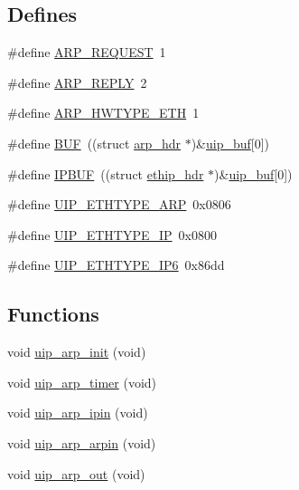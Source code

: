 \subsection*{Defines}
\begin{DoxyCompactItemize}
\item 
\#define \hyperlink{group__uiparp_ga7a7c46ffaba30477b8c9e3e61bd2e106}{ARP\_\-REQUEST}~1
\item 
\#define \hyperlink{group__uiparp_ga06ba7b414e718081998f2814090debf1}{ARP\_\-REPLY}~2
\item 
\#define \hyperlink{group__uiparp_gabb56b549f7ab4d86e1cc39b8afc70d1e}{ARP\_\-HWTYPE\_\-ETH}~1
\item 
\#define \hyperlink{group__uiparp_ga24f52ac52d6e714cb04a5aa01be3bdd0}{BUF}~((struct \hyperlink{structarp__hdr}{arp\_\-hdr} $\ast$)\&\hyperlink{group__uipdevfunc_gab81e78f890dbbee50c533a9734b74fd9}{uip\_\-buf}\mbox{[}0\mbox{]})
\item 
\#define \hyperlink{group__uiparp_ga9f2196e2705036869611962425e404bf}{IPBUF}~((struct \hyperlink{structethip__hdr}{ethip\_\-hdr} $\ast$)\&\hyperlink{group__uipdevfunc_gab81e78f890dbbee50c533a9734b74fd9}{uip\_\-buf}\mbox{[}0\mbox{]})
\item 
\#define \hyperlink{group__uiparp_ga3e1562e8a6de32268e5df92a52152f91}{UIP\_\-ETHTYPE\_\-ARP}~0x0806
\item 
\#define \hyperlink{group__uiparp_ga03d140db75de3d3cdfbbab1c4fed8d8d}{UIP\_\-ETHTYPE\_\-IP}~0x0800
\item 
\#define \hyperlink{group__uiparp_gabb558f3a9b1ec015e83c314aba694e35}{UIP\_\-ETHTYPE\_\-IP6}~0x86dd
\end{DoxyCompactItemize}
\subsection*{Functions}
\begin{DoxyCompactItemize}
\item 
void \hyperlink{group__uiparp_ga2d9d28afa353f662b9bb5234fc419f72}{uip\_\-arp\_\-init} (void)
\item 
void \hyperlink{group__uiparp_ga058a8e6025f67b021862281f1911fcef}{uip\_\-arp\_\-timer} (void)
\item 
void \hyperlink{group__uiparp_ga5cf8d6974a89ad67c5faf9b19261cb7c}{uip\_\-arp\_\-ipin} (void)
\item 
void \hyperlink{group__uiparp_ga902c4a360134096224bc2655f623aa5f}{uip\_\-arp\_\-arpin} (void)
\item 
void \hyperlink{group__uiparp_ga54b27e45df15e10a0eb1a3e3a91417d2}{uip\_\-arp\_\-out} (void)
\end{DoxyCompactItemize}
